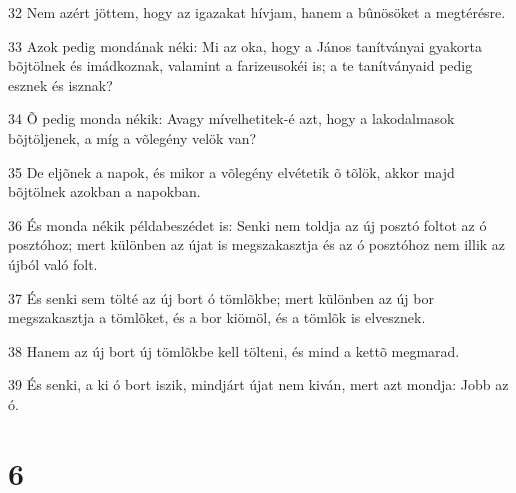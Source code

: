 \par 32 Nem azért jöttem, hogy az igazakat hívjam, hanem a bûnösöket a megtérésre.
\par 33 Azok pedig mondának néki: Mi az oka, hogy a János tanítványai gyakorta bõjtölnek és imádkoznak, valamint a farizeusokéi is; a te tanítványaid pedig esznek és isznak?
\par 34 Õ pedig monda nékik: Avagy mívelhetitek-é azt, hogy a lakodalmasok bõjtöljenek, a míg a võlegény velök van?
\par 35 De eljõnek a napok, és mikor a võlegény elvétetik õ tõlök, akkor majd bõjtölnek azokban a napokban.
\par 36 És monda nékik példabeszédet is: Senki nem toldja az új posztó foltot az ó posztóhoz; mert különben az újat is megszakasztja és az ó posztóhoz nem illik az újból való folt.
\par 37 És senki sem tölté az új bort ó tömlõkbe; mert különben az új bor megszakasztja a tömlõket, és a bor kiömöl, és a tömlõk is elvesznek.
\par 38 Hanem az új bort új tömlõkbe kell tölteni, és mind a kettõ megmarad.
\par 39 És senki, a ki ó bort iszik, mindjárt újat nem kiván, mert azt mondja: Jobb az ó.

\chapter{6}

